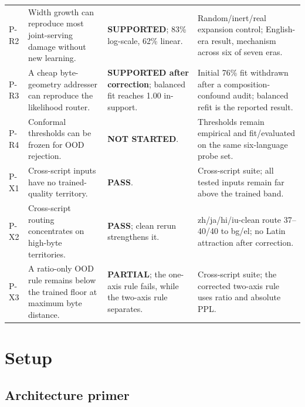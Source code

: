 \documentclass[11pt]{article}
\theoremstyle{definition}\newtheorem{definition}{Definition}
\theoremstyle{remark}\newtheorem{remark}{Remark}
\begin{document}
\begin{longtable}{@{}>{\raggedright\arraybackslash}p{} >{\raggedright\arraybackslash}p{} >{\raggedright\arraybackslash}p{} >{\raggedright\arraybackslash}p{}@{}}
P-R2 & Width growth can reproduce most joint-serving damage without new learning. & \textbf{SUPPORTED}; 83\% log-scale, 62\% linear. & Random/inert/real expansion control; English-era result, mechanism across six of seven eras. \\
P-R3 & A cheap byte-geometry addresser can reproduce the likelihood router. & \textbf{SUPPORTED after correction}; balanced fit reaches 1.00 in-support. & Initial 76\% fit withdrawn after a composition-confound audit; balanced refit is the reported result. \\
P-R4 & Conformal thresholds can be frozen for OOD rejection. & \textbf{NOT STARTED}. & Thresholds remain empirical and fit/evaluated on the same six-language probe set. \\
P-X1 & Cross-script inputs have no trained-quality territory. & \textbf{PASS}. & Cross-script suite; all tested inputs remain far above the trained band. \\
P-X2 & Cross-script routing concentrates on high-byte territories. & \textbf{PASS}; clean rerun strengthens it. & zh/ja/hi/iu-clean route 37--40/40 to bg/el; no Latin attraction after correction. \\
P-X3 & A ratio-only OOD rule remains below the trained floor at maximum byte distance. & \textbf{PARTIAL}; the one-axis rule fails, while the two-axis rule separates. & Cross-script suite; the corrected two-axis rule uses ratio and absolute PPL. \\
\bottomrule
\end{longtable}
\normalsize

\section{Setup}
\label{sec:setup}

\subsection{Architecture primer}\label{sec:primer}
\end{document}
